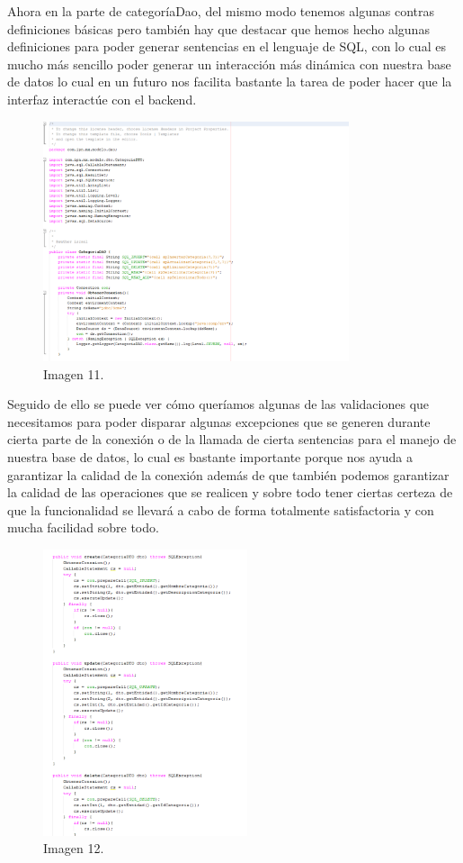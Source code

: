 \documentclass[10pt,a4paper]{article}
\begin{document}
\vspace{60mm}

Ahora en la parte de categoríaDao, del mismo modo tenemos algunas contras definiciones básicas pero también hay que destacar que hemos hecho algunas definiciones para poder generar sentencias en el lenguaje de SQL, con lo cual es mucho más sencillo poder generar un interacción más dinámica con nuestra base de datos lo cual en un futuro nos facilita bastante la tarea de poder hacer que la interfaz interactúe con el backend.

\begin{figure}[h]
\centering
\includegraphics[width=9cm]{CategoriaDao1}
\caption{Imagen 11.}
\label{fig:figure1}
\end{figure}

Seguido de ello se puede ver cómo queríamos algunas de las validaciones que necesitamos para poder disparar algunas excepciones que se generen durante cierta parte de la conexión o de la llamada de cierta sentencias para el manejo de nuestra base de datos, lo cual es bastante importante porque nos ayuda a garantizar la calidad de la conexión además de que también podemos garantizar la calidad de las operaciones que se realicen y sobre todo tener ciertas certeza de que la funcionalidad se llevará a cabo de forma totalmente satisfactoria y con mucha facilidad sobre todo.
\begin{figure}[h]
\centering
\includegraphics[width=6cm]{CategoriaDao2}
\caption{Imagen 12.}
\label{fig:figure1}
\end{figure}
\end{document}
